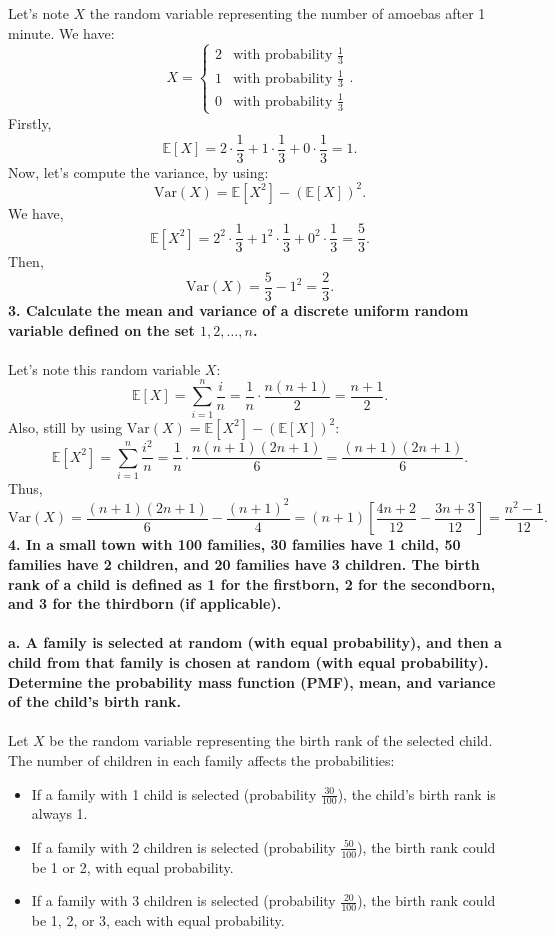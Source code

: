 \documentclass[a4paper,11pt]{article}
\begin{document}
\\ \\
Let's note $X$ the random variable representing the number of amoebas after 1 minute. We have:
\[
X = 
\begin{cases} 
2 & \text{with probability } \frac{1}{3} \\
1 & \text{with probability } \frac{1}{3} \\
0 & \text{with probability } \frac{1}{3}
\end{cases}.
\]
Firstly,
\[
\boxed{
\mathbb{E}[X] = 2 \cdot \frac{1}{3} + 1 \cdot \frac{1}{3} + 0 \cdot \frac{1}{3} = 1.
}
\]
Now, let's compute the variance, by using:
\[
\text{Var}(X) = \mathbb{E}[X^2] - (\mathbb{E}[X])^2.
\]
We have,
\[
\mathbb{E}[X^2] = 2^2 \cdot \frac{1}{3} + 1^2 \cdot \frac{1}{3} + 0^2 \cdot \frac{1}{3} = \frac{5}{3}.
\]
Then,
\[
\boxed{
\text{Var}(X) = \frac{5}{3} - 1^2 = \frac{2}{3}.
}
\]
\textbf{3. Calculate the mean and variance of a discrete uniform random variable defined on the set ${1, 2, \dots, n}$.}
\\ \\
Let's note this random variable $X$:
\[
\boxed{
\mathbb{E}[X] = \sum_{i=1}^n \frac{i}{n} = \frac{1}{n} \cdot \frac{n(n+1)}{2} = \frac{n+1}{2}.
}
\]
Also, still by using $\text{Var}(X) = \mathbb{E}[X^2] - (\mathbb{E}[X])^2$:
\[
\mathbb{E}[X^2] = \sum_{i=1}^n \frac{i^2}{n} = \frac{1}{n} \cdot \frac{n(n+1)(2n+1)}{6} = \frac{(n+1)(2n+1)}{6}.
\]
Thus,
\[
\boxed{
\text{Var}(X) = \frac{(n+1)(2n+1)}{6} - \frac{(n+1)^2}{4} = (n+1)\left[\frac{4n + 2}{12} - \frac{3n + 3}{12}\right] = \frac{n^2 - 1}{12}.
}
\]
\textbf{4. In a small town with 100 families, 30 families have 1 child, 50 families have 2 children, and 20 families have 3 children. The birth rank of a child is defined as 1 for the firstborn, 2 for the secondborn, and 3 for the thirdborn (if applicable).}
\\ \\
\textbf{a. A family is selected at random (with equal probability), and then a child from that family is chosen at random (with equal probability). Determine the probability mass function (PMF), mean, and variance of the child's birth rank.}
\\ \\
Let $X$ be the random variable representing the birth rank of the selected child. The number of children in each family affects the probabilities:
\begin{itemize}
    \item If a family with 1 child is selected (probability $\frac{30}{100}$), the child’s birth rank is always 1.
    \item If a family with 2 children is selected (probability $\frac{50}{100}$), the birth rank could be 1 or 2, with equal probability.
    \item If a family with 3 children is selected (probability $\frac{20}{100}$), the birth rank could be 1, 2, or 3, each with equal probability.
\end{itemize}
\end{document}

